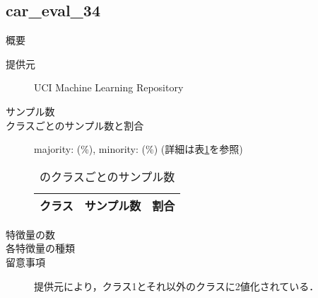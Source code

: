 \subsection{car\_eval\_34}
\begin{description}
    \item[概要] \cite{}
    \item[提供元] UCI Machine Learning Repository
    \item[サンプル数] 
    \item[クラスごとのサンプル数と割合] majority:  (\%), minority:  (\%) (詳細は表\ref{tab:}を参照)

        \begin{table}
            \centering
            \caption{のクラスごとのサンプル数}
            \label{tab:}
            \begin{tabular}{lrc} \hline
                \multicolumn{1}{c}{クラス}&
                \multicolumn{1}{c}{サンプル数}&
                \multicolumn{1}{c}{割合}\\
                \hline
                \hline

                \hline
            \end{tabular}
        \end{table}

    \item[特徴量の数] 
    \item[各特徴量の種類] \mbox{}
        
    \item[留意事項] 提供元により，クラス1とそれ以外のクラスに2値化されている．
\end{description}

